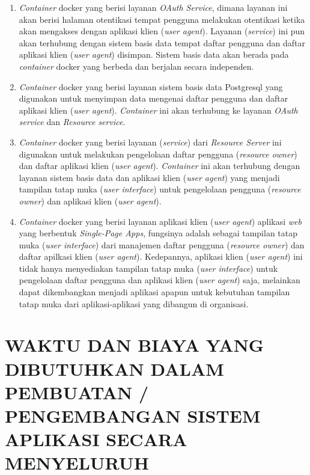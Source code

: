 \documentclass[pdftex,12pt, oneside]{article}
\begin{document}
\begin{enumerate}
	\item \textit{Container} docker yang berisi layanan \textit{OAuth Service}, dimana layanan ini akan berisi halaman otentikasi tempat pengguna melakukan otentikasi ketika akan mengakses dengan aplikasi klien (\textit{user agent}). Layanan (\textit{service}) ini pun akan terhubung dengan sistem basis data tempat daftar pengguna dan daftar aplikasi klien (\textit{user agent}) disimpan. Sistem basis data akan berada pada \textit{container} docker yang berbeda dan berjalan secara independen.
	
	\item \textit{Container} docker yang berisi layanan sistem basis data Postgresql yang digunakan untuk menyimpan data mengenai daftar pengguna dan daftar aplikasi klien (\textit{user agent}). \textit{Container} ini akan terhubung ke layanan \textit{OAuth service} dan \textit{Resource service}.
	
	\item \textit{Container} docker yang berisi layanan (\textit{service}) dari \textit{Resource Server} ini digunakan untuk melakukan pengelolaan daftar pengguna (\textit{resource owner}) dan daftar aplikasi klien (\textit{user agent}). \textit{Container} ini akan terhubung dengan layanan sistem basis data dan aplikasi klien (\textit{user agent}) yang menjadi tampilan tatap muka (\textit{user interface}) untuk pengelolaan pengguna (\textit{resource owner}) dan aplikasi klien (\textit{user agent}).
	
	\item \textit{Container} docker yang berisi layanan aplikasi klien (\textit{user agent}) aplikasi \textit{web} yang berbentuk \textit{Single-Page Apps}, fungsinya adalah sebagai tampilan tatap muka (\textit{user interface}) dari manajemen daftar pengguna (\textit{resource owner}) dan daftar apilkasi klien (\textit{user agent}). Kedepannya, aplikasi klien (\textit{user agent}) ini tidak hanya menyediakan tampilan tatap muka (\textit{user interface}) untuk pengelolaan daftar pengguna dan aplikasi klien (\textit{user agent}) saja, melainkan dapat dikembangkan menjadi aplikasi apapun untuk kebutuhan tampilan tatap muka dari aplikasi-aplikasi yang dibangun di organisasi.
	
\end{enumerate}

\section{WAKTU DAN BIAYA YANG DIBUTUHKAN DALAM PEMBUATAN / PENGEMBANGAN SISTEM APLIKASI SECARA MENYELURUH}
\end{document}
